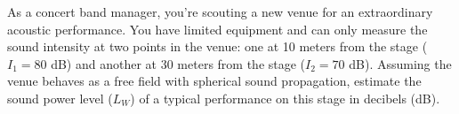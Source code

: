\documentclass[border=0pt]{standalone}
\begin{document}
\begin{tcolorbox}[
    enhanced,
    colback=blue!5,
    colframe=questioncolor,
    boxrule=1pt,
    arc=5mm,
    outer arc=1mm,
    drop fuzzy shadow=questioncolor,
]
\begin{minipage}{0.95\linewidth}
\color{questioncolor}\sffamily\large
As a concert band manager, you're scouting a new venue for an extraordinary acoustic performance. You have limited equipment and can only measure the sound intensity at two points in the venue: one at 10 meters from the stage ($I_1 = 80$ dB) and another at 30 meters from the stage ($I_2 = 70$ dB). Assuming the venue behaves as a free field with spherical sound propagation, estimate the sound power level ($L_W$) of a typical performance on this stage in decibels (dB).
\end{minipage}
\end{tcolorbox}
\end{document}
